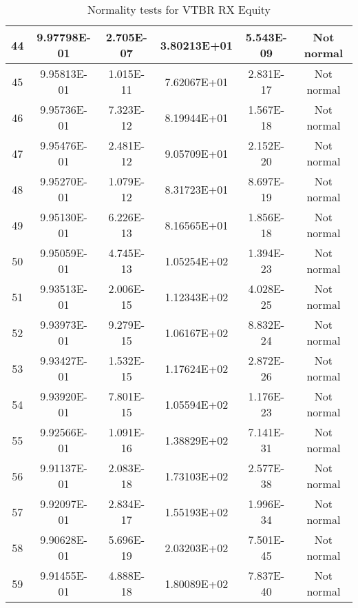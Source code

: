 \begin{table}[h]
\begin{tabular}{|c|c|c|c|c|c|}
		44 & 9.97798E-01 & 2.705E-07 & 3.80213E+01 & 5.543E-09 & Not normal\\\hline
		45 & 9.95813E-01 & 1.015E-11 & 7.62067E+01 & 2.831E-17 & Not normal\\\hline
		46 & 9.95736E-01 & 7.323E-12 & 8.19944E+01 & 1.567E-18 & Not normal\\\hline
		47 & 9.95476E-01 & 2.481E-12 & 9.05709E+01 & 2.152E-20 & Not normal\\\hline
		48 & 9.95270E-01 & 1.079E-12 & 8.31723E+01 & 8.697E-19 & Not normal\\\hline
		49 & 9.95130E-01 & 6.226E-13 & 8.16565E+01 & 1.856E-18 & Not normal\\\hline
		50 & 9.95059E-01 & 4.745E-13 & 1.05254E+02 & 1.394E-23 & Not normal\\\hline
		51 & 9.93513E-01 & 2.006E-15 & 1.12343E+02 & 4.028E-25 & Not normal\\\hline
		52 & 9.93973E-01 & 9.279E-15 & 1.06167E+02 & 8.832E-24 & Not normal\\\hline
		53 & 9.93427E-01 & 1.532E-15 & 1.17624E+02 & 2.872E-26 & Not normal\\\hline
		54 & 9.93920E-01 & 7.801E-15 & 1.05594E+02 & 1.176E-23 & Not normal\\\hline
		55 & 9.92566E-01 & 1.091E-16 & 1.38829E+02 & 7.141E-31 & Not normal\\\hline
		56 & 9.91137E-01 & 2.083E-18 & 1.73103E+02 & 2.577E-38 & Not normal\\\hline
		57 & 9.92097E-01 & 2.834E-17 & 1.55193E+02 & 1.996E-34 & Not normal\\\hline
		58 & 9.90628E-01 & 5.696E-19 & 2.03203E+02 & 7.501E-45 & Not normal\\\hline
		59 & 9.91455E-01 & 4.888E-18 & 1.80089E+02 & 7.837E-40 & Not normal\\\hline
	\end{tabular}
	\caption{Normality tests for VTBR RX Equity}
	\label{tab:normality_tests_VTBR_RX}
\end{table}
